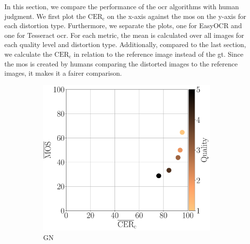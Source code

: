 In this section, we compare the performance of the \gls{ocr} algorithms with human judgment.
We first plot the $\text{CER}_{\text{c}}$ on the x-axis against the \gls{mos} on the y-axis for each distortion type.
Furthermore, we separate the plots, one for EasyOCR and one for Tesseract \gls{ocr}.
For each metric, the mean is calculated over all images for each quality level and distortion type.
Additionally, compared to the last section, we calculate the $\text{CER}_{\text{c}}$ in relation to the reference image instead of the \gls{gt}.
Since the \gls{mos} is created by humans comparing the distorted images to the reference images, it makes it a fairer comparison.

\begin{figure}[h!]
\centering
    \begin{subfigure}[b]{0.3\textwidth}
        \includegraphics[width=\textwidth]{../../images/analyze/mos_cer_ref_mean_ezocr_GN.pdf}
        \caption{GN}
        \label{fig:mos_cer_ref_mean_ezocr_GN}
    \end{subfigure}
    \hfill
    \begin{subfigure}[b]{0.3\textwidth}

\end{subfigure}
\end{figure}
